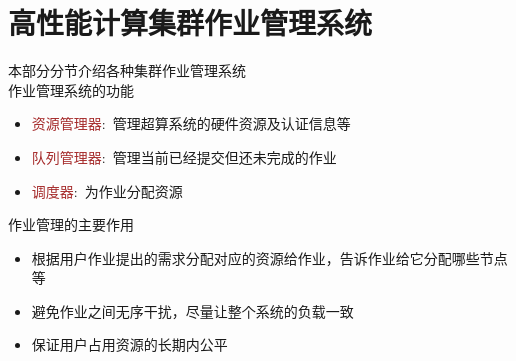 \documentclass{article}      %
\begin{document}
\section{高性能计算集群作业管理系统}
本部分分节介绍各种集群作业管理系统\\
作业管理系统的功能
\begin{itemize}
	\item \textcolor{brown}{资源管理器}:~管理超算系统的硬件资源及认证信息等
	\item \textcolor{brown}{队列管理器}:~管理当前已经提交但还未完成的作业
	\item \textcolor{brown}{调度器}:~为作业分配资源
\end{itemize}
作业管理的主要作用
\begin{itemize}
	\item 根据用户作业提出的需求分配对应的资源给作业，告诉作业给它分配哪些节点等
	\item 避免作业之间无序干扰，尽量让整个系统的负载一致
	\item 保证用户占用资源的长期内公平
\end{itemize}
\end{document}

